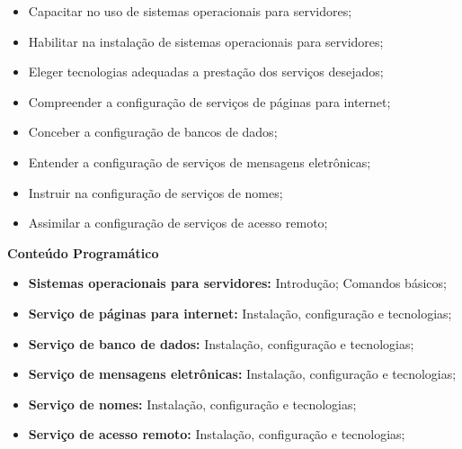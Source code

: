 \begin{itemize}

\item Capacitar no uso de sistemas operacionais para servidores;

\item Habilitar na instalação de sistemas operacionais para servidores;

\item Eleger tecnologias adequadas a prestação dos serviços desejados;

\item Compreender a configuração de serviços de páginas para internet;

\item Conceber a configuração de bancos de dados;

\item Entender a configuração de serviços de mensagens eletrônicas;

\item Instruir na configuração de serviços de nomes;

\item Assimilar a configuração de serviços de acesso remoto;

\end{itemize} 


\begin{snugshade}\begin{center}\textbf{
    Conteúdo Programático
}\end{center}\end{snugshade}

\begin{itemize}

\item \textbf{Sistemas operacionais para servidores:}
    Introdução; Comandos básicos;

\item \textbf{Serviço de páginas para internet:}
    Instalação, configuração e tecnologias;

\item \textbf{Serviço de banco de dados:}
    Instalação, configuração e tecnologias;
    
\item \textbf{Serviço de mensagens eletrônicas:}
    Instalação, configuração e tecnologias;
    
\item \textbf{Serviço de nomes:}
    Instalação, configuração e tecnologias;
    
\item \textbf{Serviço de acesso remoto:}
    Instalação, configuração e tecnologias;    

\end{itemize}

